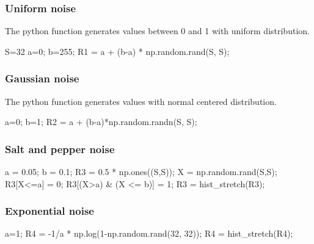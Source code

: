 \subsubsection{Uniform noise}
The python  function generates values between 0 and 1 with uniform distribution.

\begin{python}
S=32
a=0; b=255;
R1 = a + (b-a) * np.random.rand(S, S);
\end{python}

\subsubsection{Gaussian noise}
The python  function generates values with normal centered distribution.
\begin{python}
a=0; b=1;
R2 = a + (b-a)*np.random.randn(S, S);
\end{python}

\subsubsection{Salt and pepper noise}
\begin{python} 
a = 0.05; b = 0.1;
R3 = 0.5 * np.ones((S,S));
X = np.random.rand(S,S);
R3[X<=a] = 0;
R3[(X>a) & (X <= b)] = 1;
R3 = hist_stretch(R3);
\end{python}


\subsubsection{Exponential noise}
\begin{python}
a=1;
R4 = -1/a * np.log(1-np.random.rand(32, 32));
R4 = hist_stretch(R4); 
\end{python}

